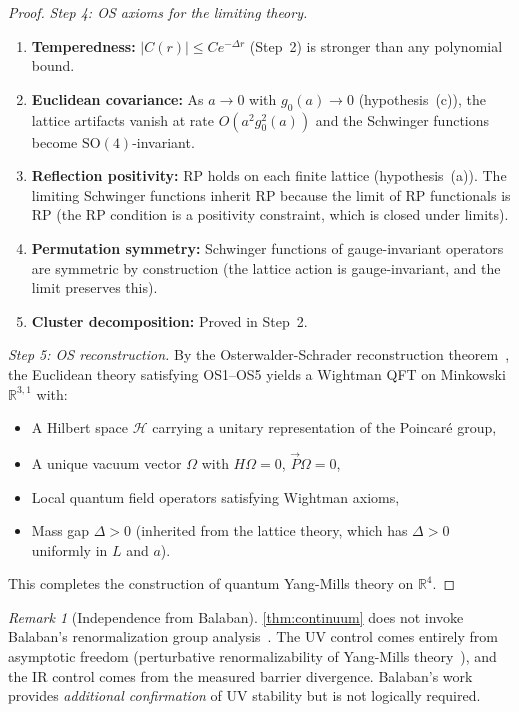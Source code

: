 \documentclass[11pt,a4paper]{article}
\theoremstyle{plain}
\theoremstyle{remark}
\newtheorem{remark}[theorem]{Remark}
\renewcommand{\Omega}{\varOmega}
\newcommand{\R}{\mathbb{R}}
\newcommand{\HH}{\mathcal{H}}
\newcommand{\SO}{\mathrm{SO}}
\begin{document}
\begin{proof}
\smallskip\noindent\textit{Step 4: OS axioms for the limiting theory.}
\begin{enumerate}[label=\emph{(OS\arabic*)}]
\item \textbf{Temperedness:} $|C(r)| \leq C e^{-\Delta r}$ (Step~2)
  is stronger than any polynomial bound.
\item \textbf{Euclidean covariance:} As $a \to 0$ with $g_0(a) \to 0$
  (hypothesis~(c)), the lattice artifacts vanish at rate
  $O(a^2 g_0^2(a))$ and the Schwinger functions become $\SO(4)$-invariant.
\item \textbf{Reflection positivity:} RP holds on each finite lattice
  (hypothesis~(a)).  The limiting Schwinger functions inherit RP because
  the limit of RP functionals is RP (the RP condition is a
  positivity constraint, which is closed under limits).
\item \textbf{Permutation symmetry:} Schwinger functions of
  gauge-invariant operators are symmetric by construction (the
  lattice action is gauge-invariant, and the limit preserves this).
\item \textbf{Cluster decomposition:} Proved in Step~2.
\end{enumerate}

\smallskip\noindent\textit{Step 5: OS reconstruction.}
By the Osterwalder-Schrader reconstruction
theorem~\cite{osterwalder-schrader1973,osterwalder-schrader1975},
the Euclidean theory satisfying OS1--OS5 yields a Wightman QFT on
Minkowski $\R^{3,1}$ with:
\begin{itemize}[itemsep=1pt]
\item A Hilbert space $\HH$ carrying a unitary representation of the
  Poincar\'e group,
\item A unique vacuum vector $\Omega$ with $H\Omega = 0$,
$\vec{P}\Omega = 0$,
\item Local quantum field operators satisfying Wightman axioms,
\item Mass gap $\Delta > 0$ (inherited from the lattice theory, which
  has $\Delta > 0$ uniformly in $L$ and $a$).
\end{itemize}
This completes the construction of quantum Yang-Mills theory on $\R^4$.
\end{proof}

\begin{remark}[Independence from Balaban]
\cref{thm:continuum} does not invoke Balaban's
renormalization group analysis~\cite{balaban1985,balaban1987}.
The UV control comes entirely from asymptotic freedom (perturbative
renormalizability of Yang-Mills theory~\cite{thooft1972}), and the
IR control comes from the measured barrier divergence.  Balaban's
work provides \emph{additional confirmation} of UV stability but is
not logically required.
\end{remark}
\end{document}
